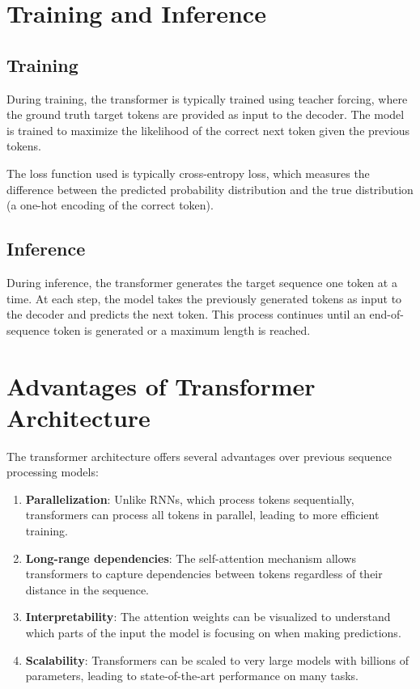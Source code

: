 \documentclass{article}
\begin{document}
\section{Training and Inference}

\subsection{Training}

During training, the transformer is typically trained using teacher forcing, where the ground truth target tokens are provided as input to the decoder. The model is trained to maximize the likelihood of the correct next token given the previous tokens.

The loss function used is typically cross-entropy loss, which measures the difference between the predicted probability distribution and the true distribution (a one-hot encoding of the correct token).

\subsection{Inference}

During inference, the transformer generates the target sequence one token at a time. At each step, the model takes the previously generated tokens as input to the decoder and predicts the next token. This process continues until an end-of-sequence token is generated or a maximum length is reached.

\section{Advantages of Transformer Architecture}

The transformer architecture offers several advantages over previous sequence processing models:

\begin{enumerate}
    \item \textbf{Parallelization}: Unlike RNNs, which process tokens sequentially, transformers can process all tokens in parallel, leading to more efficient training.
    \item \textbf{Long-range dependencies}: The self-attention mechanism allows transformers to capture dependencies between tokens regardless of their distance in the sequence.
    \item \textbf{Interpretability}: The attention weights can be visualized to understand which parts of the input the model is focusing on when making predictions.
    \item \textbf{Scalability}: Transformers can be scaled to very large models with billions of parameters, leading to state-of-the-art performance on many tasks.
\end{enumerate}
\end{document}
